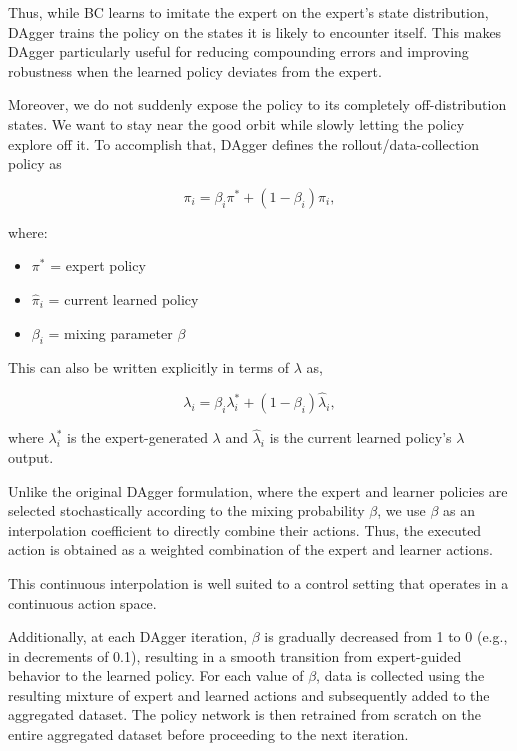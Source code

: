 Thus, while BC learns to imitate the expert on the expert's state
distribution, DAgger trains the policy on the states it is likely to
encounter itself. This makes DAgger particularly useful for reducing
compounding errors and improving robustness when the learned policy
deviates from the expert.

Moreover, we do not suddenly expose the policy to its completely
off-distribution states. We want to stay near the good orbit while
slowly letting the policy explore off it. To accomplish that, DAgger
defines the rollout/data-collection policy as

\begin{equation}
  \pi_i = \beta_i \pi^* + (1-\beta_i)\hat{\pi}_i,
  \label{eq:dagger-mixing}
\end{equation}

where:

\begin{itemize}
  \item $\pi^*$ = expert policy
  \item $\hat{\pi}_i$ = current learned policy
  \item $\beta_i$ = mixing parameter $\beta$
\end{itemize}

This can also be written explicitly in terms of $\lambda$ as,

\begin{equation}
  \lambda_i = \beta_i \lambda_i^* + (1-\beta_i)\hat{\lambda}_i,
  \label{eq:dagger-mixing-lambda}
\end{equation}

where $\lambda_i^*$ is the expert-generated $\lambda$ and
$\hat{\lambda}_i$ is the current learned policy's $\lambda$ output.

Unlike the original DAgger formulation, where the expert and learner
policies are selected stochastically according to the mixing probability
$\beta$, we use $\beta$ as an interpolation coefficient to directly
combine their actions. Thus, the executed action is obtained as a
weighted combination of the expert and learner actions.

This continuous interpolation is well suited to a control setting that
operates in a continuous action space.

Additionally, at each DAgger iteration, $\beta$ is gradually decreased
from 1 to 0 (e.g., in decrements of 0.1), resulting in a smooth
transition from expert-guided behavior to the learned policy. For each
value of $\beta$, data is collected using the resulting mixture of
expert and learned actions and subsequently added to the aggregated
dataset. The policy network is then retrained from scratch on the
entire aggregated dataset before proceeding to the next iteration.

